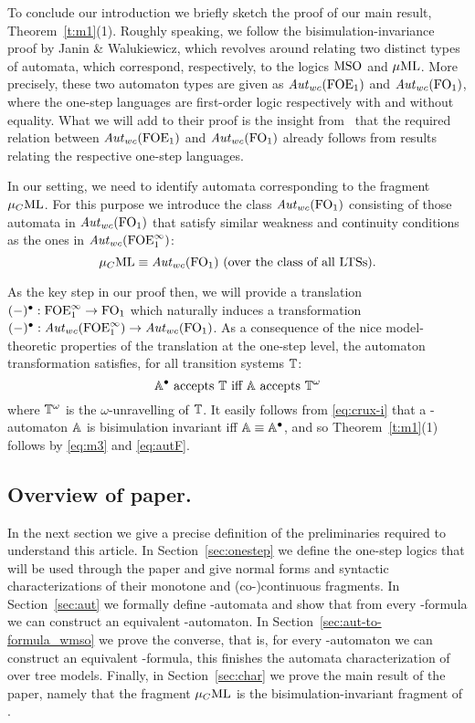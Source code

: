 To conclude our introduction we briefly sketch the proof of our main result, 
Theorem~\ref{t:m1}(1).
Roughly speaking, we follow the bisimulation-invariance proof by Janin \& 
Walukiewicz, which revolves around relating two distinct types of automata, 
which correspond, respectively, to the logics $\mathrm{MSO}$ and $\mu\mathrm{ML}$.
More precisely, these two automaton types are given as $\mathit{Aut}_{wc}(\mathrm{FOE}_1)$ and
$\mathit{Aut}_{wc}(\mathrm{FO}_1)$, where the one-step languages are first-order 
logic respectively with and without equality.
What we will add to their proof is the insight from~\cite{Venxx} that the
required relation between $\mathit{Aut}_{wc}(\mathrm{FOE}_1)$ and $\mathit{Aut}_{wc}(\mathrm{FO}_1)$ already follows
from results relating the respective one-step languages.

In our setting, we need to identify automata corresponding to the fragment
$\mu_{C}\mathrm{ML}$.
For this purpose we introduce the class $\mathit{Aut}_{wc}(\mathrm{FO}_1)$ consisting of those
automata in $\mathit{Aut}_{wc}(\mathrm{FO}_1)$ that satisfy similar weakness and continuity 
conditions as the ones in $\mathit{Aut}_{wc}(\mathrm{FOE}^{\infty}_1)$:
\begin{equation}
\label{eq:autF}
\mucML \equiv \AutWC(\ofo) \text{ (over the class of all LTSs)}.
\end{equation}

As the key step in our proof then, we will provide a translation 
$(-)^{\bullet}: \mathrm{FOE}^{\infty}_1 \to \mathrm{FO}_1$ which naturally induces a transformation 
$(-)^{\bullet}: \mathit{Aut}_{wc}(\mathrm{FOE}^{\infty}_1) \to \mathit{Aut}_{wc}(\mathrm{FO}_1)$.
As a consequence of the nice model-theoretic properties of the translation at 
the one-step level, the automaton transformation satisfies, for all 
transition systems $\mathbb{T}$:
\begin{equation}
\label{eq:crux-i}
\bbA^{\bullet} \text{ accepts } \bbT \text{ iff } \bbA \text{ accepts 
} \omegaunrav{\bbT}
\end{equation}
where ${\mathbb{T}}^\omega$ is the $\omega$-unravelling of $\mathbb{T}$.
It easily follows from \eqref{eq:crux-i} that a \wmso-automaton $\mathbb{A}$
is bisimulation invariant iff $\mathbb{A}\equiv \mathbb{A}^{\bullet}$, and so 
Theorem~\ref{t:m1}(1) follows by \eqref{eq:m3} and \eqref{eq:autF}.

\subsection{Overview of paper.}
In the next section we give a precise definition of the preliminaries required 
to understand this article. 
In Section~\ref{sec:onestep} we define the one-step logics that will be used 
through the paper and give normal forms and syntactic characterizations of their monotone and (co-)continuous fragments. In Section~\ref{sec:aut} we formally define \wmso-automata and show that from every \wmso-formula we can construct an equivalent \wmso-automaton. In Section~\ref{sec:aut-to-formula_wmso} we prove the converse, that is, for every \wmso-automaton we can construct an equivalent \wmso-formula, this finishes the automata characterization of \wmso over tree models. Finally, in Section~\ref{sec:char} we prove the main result of the paper, namely that the fragment $\mu_{C}\mathrm{ML}$ is the bisimulation-invariant fragment of \wmso.


